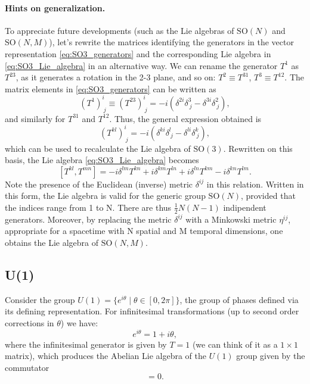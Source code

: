 \paragraph{Hints on generalization.}
To appreciate future developments (such as the Lie algebras of \(\mathrm{SO}(N)\) and \(\mathrm{SO}(N,M)\)), let’s rewrite the matrices identifying the generators in the vector representation \eqref{eq:SO3_generators} and the corresponding Lie algebra in \eqref{eq:SO3_Lie_algebra} in an alternative way. We can rename the generator \(T^1\) as \(T^{23}\), as it generates a rotation in the 2-3 plane, and so on: \(T^2 \equiv T^{31}\), \(T^3 \equiv T^{12}\). The matrix elements in \eqref{eq:SO3_generators} can be written as
\[
    (T^1)^i_{\ j} \equiv (T^{23})^i_{\ j} = -i(\delta^{2i}\delta^3_{\ j} - \delta^{3i}\delta^2_{\ j}),
\]
and similarly for \(T^{31}\) and \(T^{12}\). Thus, the general expression obtained is
\[
    (T^{kl})^i_{\ j} = -i(\delta^{ki}\delta^l_{\ j} - \delta^{li}\delta^k_{\ j}),
\]
which can be used to recalculate the Lie algebra of \(\mathrm{SO}(3)\). Rewritten on this basis, the Lie algebra \eqref{eq:SO3_Lie_algebra} becomes
\[
    [T^{kl}, T^{mn}] = -i\delta^{lm}T^{kn} + i\delta^{km}T^{ln} + i\delta^{ln}T^{km} - i\delta^{kn}T^{lm}.
\]
Note the presence of the Euclidean (inverse) metric \(\delta^{ij}\) in this relation. Written in this form, the Lie algebra is valid for the generic group \(\mathrm{SO}(N)\), provided that the indices range from 1 to N. There are thus \(\tfrac12 N (N-1)\) indipendent generators. Moreover, by replacing the metric \(\delta^{ij}\) with a Minkowski metric \(\eta^{ij}\), appropriate for a spacetime with N spatial and M temporal dimensions, one obtains the Lie algebra of \(\mathrm{SO}(N, M)\).

\subsection{U(1)}

Consider the group $U(1) = \{ e^{i\theta} \mid \theta \in [0, 2\pi] \}$, the group of phases defined via its defining representation. For infinitesimal transformations (up to second order corrections in $\theta$) we have:
\[
    e^{i\theta} = 1 + i\theta,
\]
where the infinitesimal generator is given by $T = 1$ (we can think of it as a $1 \times 1$ matrix), which produces the Abelian Lie algebra of the $U(1)$ group given by the commutator
\begin{equation}
    [T, T] = 0.
    \label{eq:U1_Lie_algebra}
\end{equation}


